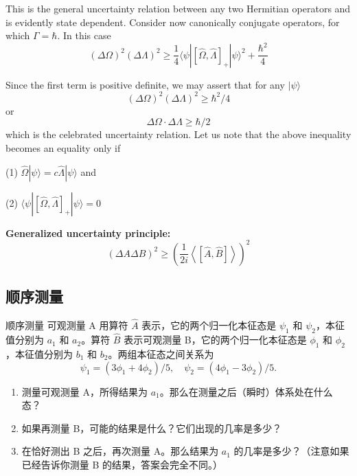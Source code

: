 This is the general uncertainty relation between any two Hermitian operators and is evidently state dependent. Consider now canonically conjugate operators, for which $\Gamma = \hbar$. In this case
\begin{equation}
	(\Delta\Omega)^{2}(\Delta\Lambda)^{2} \geq \frac{1}{4}\langle\psi|[\hat{\Omega},\hat{\Lambda}]_{+}|\psi\rangle^{2} + \frac{\hbar^{2}}{4}
\end{equation}

Since the first term is positive definite, we may assert that for any $|\psi\rangle$
\[
(\Delta\Omega)^{2}(\Delta\Lambda)^{2} \geq \hbar^{2}/4
\]
or
\begin{equation}
	\Delta\Omega \cdot \Delta\Lambda \geq \hbar/2
\end{equation}
which is the celebrated uncertainty relation. Let us note that the above inequality becomes an equality only if
\par
(1) $\hat{\Omega}|\psi\rangle = c\hat{\Lambda}|\psi\rangle$ 
\newline
and
\par
(2) $\langle\psi|[\hat{\Omega},\hat{\Lambda}]_{+}|\psi\rangle = 0$

\textbf{Generalized uncertainty principle:}
\[\boxed{
	{\left( {\Delta A\Delta B} \right)^2} \ge {\left( {\frac{1}{{2i}}\left\langle {\left[ {\hat A,\hat B} \right]} \right\rangle } \right)^2}
}\]
\subsection{顺序测量}
\begin{problembox}{顺序测量}
	可观测量 A 用算符 $\hat{A}$ 表示，它的两个归一化本征态是 $\psi_{1}$ 和 $\psi_{2}$，本征值分别为 $a_{1}$ 和 $a_{2}$。算符 $\hat{B}$ 表示可观测量 B，它的两个归一化本征态是 $\phi_{1}$ 和 $\phi_{2}$，本征值分别为 $b_{1}$ 和 $b_{2}$。两组本征态之间关系为
	\[
	\psi_{1} = (3\phi_{1} + 4\phi_{2})/5, \quad \psi_{2} = (4\phi_{1} - 3\phi_{2})/5.
	\]
	
	\begin{enumerate}
		\item 测量可观测量 A，所得结果为 $a_{1}$。那么在测量之后（瞬时）体系处在什么态？
		\item 如果再测量 B，可能的结果是什么？它们出现的几率是多少？
		\item 在恰好测出 B 之后，再次测量 A。那么结果为 $a_{1}$ 的几率是多少？（注意如果已经告诉你测量 B 的结果，答案会完全不同。）
	\end{enumerate}
\end{problembox}


